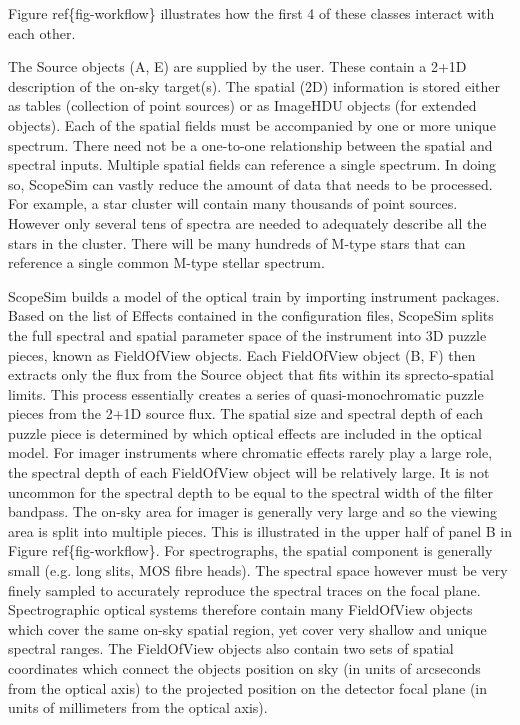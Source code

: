 Figure ref\{fig-workflow\} illustrates how the first 4 of these classes interact with each other.

The Source objects (A, E) are supplied by the user.
These contain a 2+1D description of the on-sky target(s).
The spatial (2D) information is stored either as tables (collection of point sources) or as ImageHDU objects (for extended objects).
Each of the spatial \textquotedbl{}fields\textquotedbl{} must be accompanied by one or more unique spectrum.
There need not be a one-to-one relationship between the spatial and spectral inputs.
Multiple spatial fields can reference a single spectrum.
In doing so, ScopeSim can vastly reduce the amount of data that needs to be processed.
For example, a star cluster will contain many thousands of point sources.
However only several tens of spectra are needed to adequately describe all the stars in the cluster.
There will be many hundreds of M-type stars that can reference a single common M-type stellar spectrum.

ScopeSim builds a model of the optical train by importing instrument packages.
Based on the list of Effects contained in the configuration files, ScopeSim splits the full spectral and spatial parameter space of the instrument into 3D \textquotedbl{}puzzle\textquotedbl{} pieces, known as FieldOfView objects.
Each FieldOfView object (B, F) then extracts only the flux from the Source object that fits within its sprecto-spatial limits.
This process essentially creates a series of quasi-monochromatic puzzle pieces from the 2+1D source flux.
The spatial size and spectral depth of each puzzle piece is determined by which optical effects are included in the optical model.
For imager instruments where chromatic effects rarely play a large role, the spectral depth of each FieldOfView object will be relatively large.
It is not uncommon for the spectral depth to be equal to the spectral width of the filter bandpass.
The on-sky area for imager is generally very large and so the viewing area is split into multiple pieces.
This is illustrated in the upper half of panel B in Figure ref\{fig-workflow\}.
For spectrographs, the spatial component is generally small (e.g. long slits, MOS fibre heads).
The spectral space however must be very finely sampled to accurately reproduce the spectral traces on the focal plane.
Spectrographic optical systems therefore contain many FieldOfView objects which cover the same on-sky spatial region, yet cover very shallow and unique spectral ranges.
The FieldOfView objects also contain two sets of spatial coordinates which connect the objects position on sky (in units of arcseconds from the optical axis) to the projected position on the detector focal plane (in units of millimeters from the optical axis).

